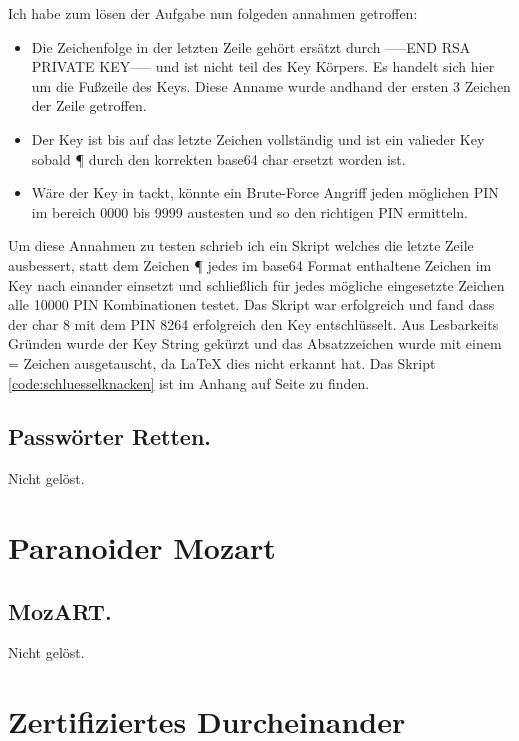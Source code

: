 \documentclass[12pt, a4paper, titlepage, oneside]{scrartcl}
\begin{document}
	Ich habe zum lösen der Aufgabe nun folgeden annahmen getroffen:

	\begin{itemize}
		\item Die Zeichenfolge in der letzten Zeile gehört ersätzt durch -----END RSA PRIVATE KEY----- und ist nicht teil des Key Körpers. Es handelt sich hier um die Fußzeile des Keys. Diese Anname wurde andhand der ersten 3 Zeichen der Zeile getroffen.
		\item Der Key ist bis auf das letzte Zeichen vollständig und ist ein valieder Key sobald ¶ durch den korrekten base64 char ersetzt worden ist. 
		\item Wäre der Key in tackt, könnte ein Brute-Force Angriff jeden möglichen PIN im bereich 0000 bis 9999 austesten und so den richtigen PIN ermitteln.
	\end{itemize}

	Um diese Annahmen zu testen schrieb ich ein Skript welches die letzte Zeile ausbessert, statt dem Zeichen ¶ jedes im base64 Format enthaltene Zeichen im Key nach einander einsetzt und schließlich für jedes mögliche eingesetzte Zeichen alle 10000 PIN Kombinationen testet. Das Skript war erfolgreich und fand dass der char 8 mit dem PIN 8264 erfolgreich den Key entschlüsselt. Aus Lesbarkeits Gründen wurde der Key String gekürzt und das Absatzzeichen wurde mit einem = Zeichen ausgetauscht, da LaTeX dies nicht erkannt hat. Das Skript \ref{code:schluesselknacken} ist im Anhang auf Seite \pageref{code:schluesselknacken} zu finden.



	\subsection{Passw\"orter Retten.}
	Nicht gelöst.

	\section{Paranoider Mozart}

	\subsection{MozART.}
	Nicht gelöst.

	\newpage

	\section{Zertifiziertes Durcheinander}
\end{document}
